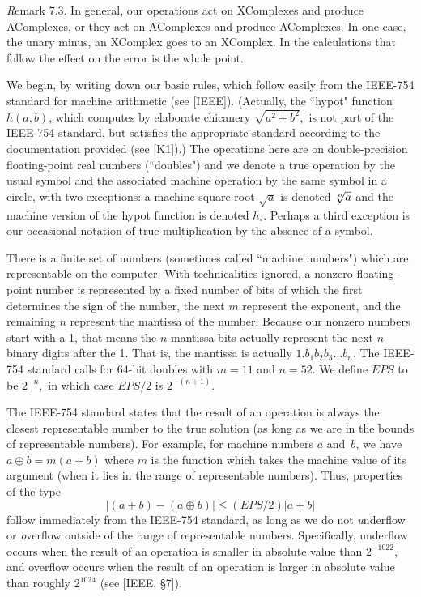 {\textit Remark} 7.3.
In general,  our operations  act on XComplexes and produce AComplexes, or they act on AComplexes and produce
 AComplexes.  In one case, the unary minus, an XComplex goes to an XComplex.  
In the calculations that follow the effect on the error is the whole point.

\begin{definition}
We begin, by writing down our basic rules, which follow easily from the IEEE-754 standard for machine arithmetic (see [IEEE]).
(Actually,  the ``hypot" function $h(a,b)$, which computes by elaborate chicanery $\sqrt{a^2 + b^2},$ is not part of the IEEE-754 standard, but  satisfies the appropriate standard according to the documentation provided (see [K1]).)  The operations here are on
double-precision floating-point real numbers (``doubles") and we denote a true operation by the usual symbol and the associated machine operation by the same symbol in a circle, with two exceptions: a machine square root $\sqrt a$ is denoted $\root o \of a$ and the machine version of the hypot function is denoted $h_\circ$.  Perhaps a third exception is our occasional notation of true multiplication by the absence of a symbol.  

There is a finite set of numbers (sometimes called ``machine numbers") which are representable on the computer.  With
technicalities ignored,    a nonzero floating-point number is represented by a fixed number of bits of which
the first determines the sign of the number, the next $m$ represent the exponent, and the remaining $n$ represent the
mantissa of the number.  Because our nonzero numbers start with a 1, that means the $n$ mantissa bits actually represent
the next
$n$ binary digits after the 1.  That is, the mantissa is actually $1.b_1b_2b_3...b_{n}.$   The IEEE-754 standard calls for
64-bit doubles with $m = 11$ and $n = 52.$  We define $EPS$ to be $2^{-n},$ in which case $EPS/2$ is $2^{-(n + 1)}.$  

The IEEE-754 standard states that the result of an operation
 is always the closest representable number to the true solution (as long as we are in the bounds of representable
numbers).  For example, for machine numbers $a$ and~$b$, we have $a \oplus b = m(a+b)$ where $m$ is the function which
takes the machine value of its argument (when it lies in the range of representable numbers).  Thus, properties of the type
$$|(a + b) - (a \oplus b)| \leq (EPS/2) |a + b|$$
follow immediately from the IEEE-754 standard, as long as we do not {\textit underflow} or {\textit overflow} outside of the range of representable numbers. 
Specifically, underflow occurs when the result of an operation is smaller in absolute value than $2^{-1022}$,
 and overflow occurs when the result of an operation is larger in absolute value than roughly $2^{1024}$
 (see [IEEE, \S 7]).


\end{definition}
